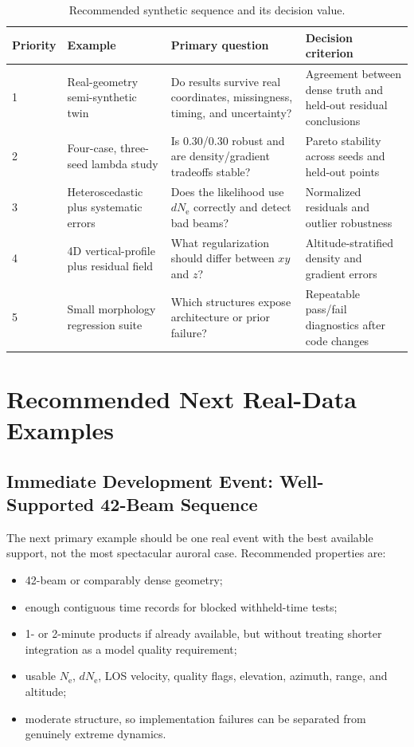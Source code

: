 \documentclass[11pt]{article}
\newcommand{\Ne}{N_{\mathrm e}}
\begin{document}
\begin{table}[H]
\centering
\caption{Recommended synthetic sequence and its decision value.}
\label{tab:syntheticplan}
\small
\begin{tabularx}{\textwidth}{p{}p{}X p{}}
\toprule
Priority & Example & Primary question & Decision criterion \\
\midrule
1 & Real-geometry semi-synthetic twin & Do results survive real coordinates, missingness, timing, and uncertainty? & Agreement between dense truth and held-out residual conclusions \\
2 & Four-case, three-seed lambda study & Is 0.30/0.30 robust and are density/gradient tradeoffs stable? & Pareto stability across seeds and held-out points \\
3 & Heteroscedastic plus systematic errors & Does the likelihood use $d\Ne$ correctly and detect bad beams? & Normalized residuals and outlier robustness \\
4 & 4D vertical-profile plus residual field & What regularization should differ between $xy$ and $z$? & Altitude-stratified density and gradient errors \\
5 & Small morphology regression suite & Which structures expose architecture or prior failure? & Repeatable pass/fail diagnostics after code changes \\
\bottomrule
\end{tabularx}
\end{table}

\section{Recommended Next Real-Data Examples}

\subsection{Immediate Development Event: Well-Supported 42-Beam Sequence}

The next primary example should be one real event with the best available support, not the most spectacular
auroral case. Recommended properties are:
\begin{itemize}
  \item 42-beam or comparably dense geometry;
  \item enough contiguous time records for blocked withheld-time tests;
  \item 1- or 2-minute products if already available, but without treating shorter integration as a model
  quality requirement;
  \item usable $\Ne$, $d\Ne$, LOS velocity, quality flags, elevation, azimuth, range, and altitude;
  \item moderate structure, so implementation failures can be separated from genuinely extreme dynamics.
\end{itemize}
\end{document}
